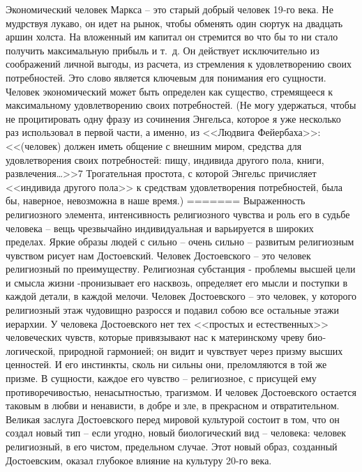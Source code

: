 \documentclass{book}
\begin{document}
Экономический человек Маркса -- это старый добрый чело­век 19‑го века. Не мудрствуя лукаво, он идет на рынок, чтобы обменять один сюртук на двадцать аршин холста. На вложен­ный им капитал он стремится во что бы то ни стало получить максимальную прибыль и т.~д. Он действует исключительно из соображений личной выгоды, из расчета, из стремления к удов­летворению своих потребностей.  Это слово является ключевым для понимания его сущности. Человек экономический может быть определен как существо, стремящееся к максимальному удовлетворению своих потребностей. (Не могу удержаться, что­бы не процитировать одну фразу из сочинения Энгельса, кото­рое я уже несколько раз использовал в первой части, а именно, из <<Людвига Фейербаха>>: << (человек) должен иметь обще­ние с внешним миром, средства для удовлетворения своих по­требностей: пищу, индивида другого пола, книги, развлече­ния\ldots>>7 Трогательная простота, с которой Энгельс причисляет <<индивида другого пола>> к средствам удовлетворения потреб­ностей, была бы, наверное, невозможна в наше время.)
=======
Выраженность религиозного элемента, интенсивность рели­гиозного чувства и роль его в судьбе человека -- вещь чрезвы­чайно индивидуальная и варьируется в широких пределах. Яр­кие образы людей с сильно -- очень сильно -- развитым религи­озным чувством рисует нам Достоевский. Человек Достоев­ского -- это человек религиозный по преимуществу.  Религиоз­ная субстанция - проблемы высшей цели и смысла жизни -пронизывает его насквозь, определяет его мысли и поступки в каждой детали, в каждой мелочи. Человек Достоевского -- это человек, у которого религиозный этаж чудовищно разрос­ся и подавил собою все остальные этажи иерархии. У человека Достоевского нет тех <<простых и естественных>> человеческих чувств, которые привязывают нас к материнскому чреву био­логической, природной гармонией; он видит и чувствует через призму высших ценностей. И его инстинкты, сколь ни сильны они, преломляются в той же призме. В сущности, каждое его чувство -- религиозное, с присущей ему противоречивостью, ненасытностью, трагизмом. И человек 
Достоевского остается таковым в любви и ненависти, в добре и зле, в прекрасном и отвратительном. Великая заслуга Достоевского перед мировой культурой состоит в том, что он создал новый тип -- если угодно, новый биологический вид -- человека: человек религиозный, в его чистом, предельном случае. Этот новый образ, созданный Достоевским, оказал глубокое влияние на культуру 20-го века.
\end{document}
